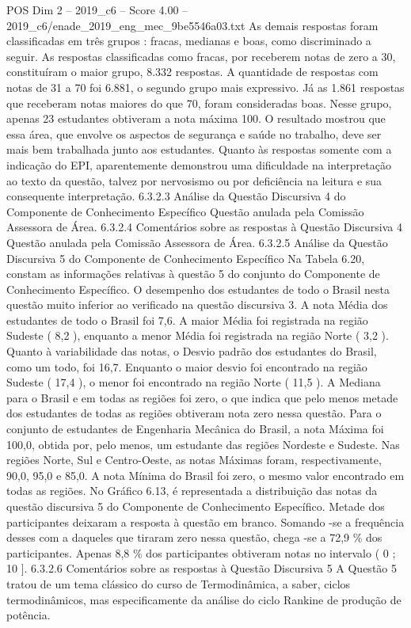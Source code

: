 \begin{textsample}{POS Dim 2 – 2019\_c6 – Score 4.00 – 2019\_c6/enade\_2019\_eng\_mec\_9be5546a03.txt}
As demais respostas foram classificadas em três grupos : fracas, medianas e boas, como discriminado a seguir.
As respostas classificadas como fracas, por receberem notas de zero a 30, constituíram o maior grupo, 8.332 respostas.
A quantidade de respostas com notas de 31 a 70 foi 6.881, o segundo grupo mais expressivo.
Já as 1.861 respostas que receberam notas maiores do que 70, foram consideradas boas.
Nesse grupo, apenas 23 estudantes obtiveram a nota máxima 100.
O resultado mostrou que essa área, que envolve os aspectos de segurança e saúde no trabalho, deve ser mais bem trabalhada junto aos estudantes.
Quanto às respostas somente com a indicação do EPI, aparentemente demonstrou uma dificuldade na interpretação ao texto da questão, talvez por nervosismo ou por deficiência na leitura e sua consequente interpretação. 6.3.2.3 Análise da Questão Discursiva 4 do Componente de Conhecimento Específico Questão anulada pela Comissão Assessora de Área. 6.3.2.4 Comentários sobre as respostas à Questão Discursiva 4 Questão anulada pela Comissão Assessora de Área. 6.3.2.5 Análise da Questão Discursiva 5 do Componente de Conhecimento Específico Na Tabela 6.20, constam as informações relativas à questão 5 do conjunto do Componente de Conhecimento Específico.
O desempenho dos estudantes de todo o Brasil nesta questão muito inferior ao verificado na questão discursiva 3.
A nota Média dos estudantes de todo o Brasil foi 7,6.
A maior Média foi registrada na região Sudeste ( 8,2 ), enquanto a menor Média foi registrada na região Norte ( 3,2 ).
Quanto à variabilidade das notas, o Desvio padrão dos estudantes do Brasil, como um todo, foi 16,7.
Enquanto o maior desvio foi encontrado na região Sudeste ( 17,4 ), o menor foi encontrado na região Norte ( 11,5 ).
A Mediana para o Brasil e em todas as regiões foi zero, o que indica que pelo menos metade dos estudantes de todas as regiões obtiveram nota zero nessa questão.
Para o conjunto de estudantes de Engenharia Mecânica do Brasil, a nota Máxima foi 100,0, obtida por, pelo menos, um estudante das regiões Nordeste e Sudeste.
Nas regiões Norte, Sul e Centro-Oeste, as notas Máximas foram, respectivamente, 90,0, 95,0 e 85,0.
A nota Mínima do Brasil foi zero, o mesmo valor encontrado em todas as regiões.
No Gráfico 6.13, é representada a distribuição das notas da questão discursiva 5 do Componente de Conhecimento Específico.
Metade dos participantes deixaram a resposta à questão em branco.
Somando -se a frequência desses com a daqueles que tiraram zero nessa questão, chega -se a 72,9 \% dos participantes.
Apenas 8,8 \% dos participantes obtiveram notas no intervalo ( 0 ; 10 ]. 6.3.2.6 Comentários sobre as respostas à Questão Discursiva 5 A Questão 5 tratou de um tema clássico do curso de Termodinâmica, a saber, ciclos termodinâmicos, mas especificamente da análise do ciclo Rankine de produção de potência.

\end{textsample}
